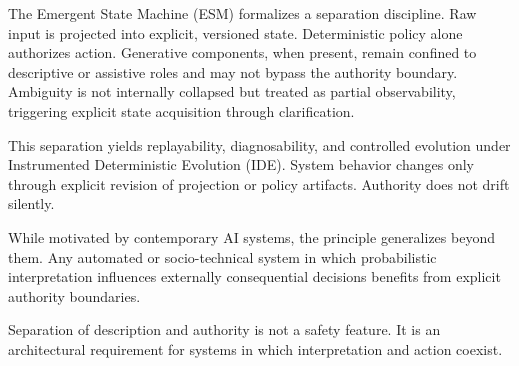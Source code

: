 \documentclass[11pt]{article}
\begin{document}
The Emergent State Machine (ESM) formalizes a separation discipline. Raw input is projected into explicit, versioned state. Deterministic policy alone authorizes action. Generative components, when present, remain confined to descriptive or assistive roles and may not bypass the authority boundary. Ambiguity is not internally collapsed but treated as partial observability, triggering explicit state acquisition through clarification.

This separation yields replayability, diagnosability, and controlled evolution under Instrumented Deterministic Evolution (IDE). System behavior changes only through explicit revision of projection or policy artifacts. Authority does not drift silently.

While motivated by contemporary AI systems, the principle generalizes beyond them. Any automated or socio-technical system in which probabilistic interpretation influences externally consequential decisions benefits from explicit authority boundaries.

Separation of description and authority is not a safety feature. It is an architectural requirement for systems in which interpretation and action coexist.





\end{document}
